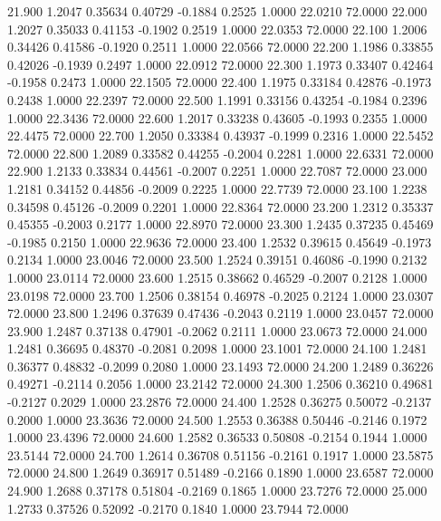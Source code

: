   21.900   1.2047   0.35634   0.40729  -0.1884   0.2525   1.0000  22.0210  72.0000
  22.000   1.2027   0.35033   0.41153  -0.1902   0.2519   1.0000  22.0353  72.0000
  22.100   1.2006   0.34426   0.41586  -0.1920   0.2511   1.0000  22.0566  72.0000
  22.200   1.1986   0.33855   0.42026  -0.1939   0.2497   1.0000  22.0912  72.0000
  22.300   1.1973   0.33407   0.42464  -0.1958   0.2473   1.0000  22.1505  72.0000
  22.400   1.1975   0.33184   0.42876  -0.1973   0.2438   1.0000  22.2397  72.0000
  22.500   1.1991   0.33156   0.43254  -0.1984   0.2396   1.0000  22.3436  72.0000
  22.600   1.2017   0.33238   0.43605  -0.1993   0.2355   1.0000  22.4475  72.0000
  22.700   1.2050   0.33384   0.43937  -0.1999   0.2316   1.0000  22.5452  72.0000
  22.800   1.2089   0.33582   0.44255  -0.2004   0.2281   1.0000  22.6331  72.0000
  22.900   1.2133   0.33834   0.44561  -0.2007   0.2251   1.0000  22.7087  72.0000
  23.000   1.2181   0.34152   0.44856  -0.2009   0.2225   1.0000  22.7739  72.0000
  23.100   1.2238   0.34598   0.45126  -0.2009   0.2201   1.0000  22.8364  72.0000
  23.200   1.2312   0.35337   0.45355  -0.2003   0.2177   1.0000  22.8970  72.0000
  23.300   1.2435   0.37235   0.45469  -0.1985   0.2150   1.0000  22.9636  72.0000
  23.400   1.2532   0.39615   0.45649  -0.1973   0.2134   1.0000  23.0046  72.0000
  23.500   1.2524   0.39151   0.46086  -0.1990   0.2132   1.0000  23.0114  72.0000
  23.600   1.2515   0.38662   0.46529  -0.2007   0.2128   1.0000  23.0198  72.0000
  23.700   1.2506   0.38154   0.46978  -0.2025   0.2124   1.0000  23.0307  72.0000
  23.800   1.2496   0.37639   0.47436  -0.2043   0.2119   1.0000  23.0457  72.0000
  23.900   1.2487   0.37138   0.47901  -0.2062   0.2111   1.0000  23.0673  72.0000
  24.000   1.2481   0.36695   0.48370  -0.2081   0.2098   1.0000  23.1001  72.0000
  24.100   1.2481   0.36377   0.48832  -0.2099   0.2080   1.0000  23.1493  72.0000
  24.200   1.2489   0.36226   0.49271  -0.2114   0.2056   1.0000  23.2142  72.0000
  24.300   1.2506   0.36210   0.49681  -0.2127   0.2029   1.0000  23.2876  72.0000
  24.400   1.2528   0.36275   0.50072  -0.2137   0.2000   1.0000  23.3636  72.0000
  24.500   1.2553   0.36388   0.50446  -0.2146   0.1972   1.0000  23.4396  72.0000
  24.600   1.2582   0.36533   0.50808  -0.2154   0.1944   1.0000  23.5144  72.0000
  24.700   1.2614   0.36708   0.51156  -0.2161   0.1917   1.0000  23.5875  72.0000
  24.800   1.2649   0.36917   0.51489  -0.2166   0.1890   1.0000  23.6587  72.0000
  24.900   1.2688   0.37178   0.51804  -0.2169   0.1865   1.0000  23.7276  72.0000
  25.000   1.2733   0.37526   0.52092  -0.2170   0.1840   1.0000  23.7944  72.0000
